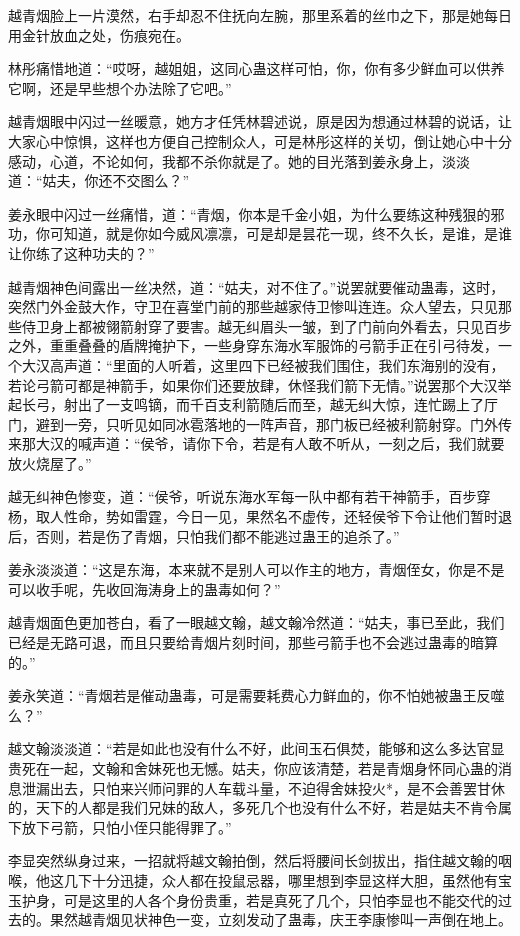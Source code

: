 越青烟脸上一片漠然，右手却忍不住抚向左腕，那里系着的丝巾之下，那是她每日用金针放血之处，伤痕宛在。

林彤痛惜地道：“哎呀，越姐姐，这同心蛊这样可怕，你，你有多少鲜血可以供养它啊，还是早些想个办法除了它吧。”

越青烟眼中闪过一丝暖意，她方才任凭林碧述说，原是因为想通过林碧的说话，让大家心中惊惧，这样也方便自己控制众人，可是林彤这样的关切，倒让她心中十分感动，心道，不论如何，我都不杀你就是了。她的目光落到姜永身上，淡淡道：“姑夫，你还不交图么？”

姜永眼中闪过一丝痛惜，道：“青烟，你本是千金小姐，为什么要练这种残狠的邪功，你可知道，就是你如今威风凛凛，可是却是昙花一现，终不久长，是谁，是谁让你练了这种功夫的？”

越青烟神色间露出一丝决然，道：“姑夫，对不住了。”说罢就要催动蛊毒，这时，突然门外金鼓大作，守卫在喜堂门前的那些越家侍卫惨叫连连。众人望去，只见那些侍卫身上都被翎箭射穿了要害。越无纠眉头一皱，到了门前向外看去，只见百步之外，重重叠叠的盾牌掩护下，一些身穿东海水军服饰的弓箭手正在引弓待发，一个大汉高声道：“里面的人听着，这里四下已经被我们围住，我们东海别的没有，若论弓箭可都是神箭手，如果你们还要放肆，休怪我们箭下无情。”说罢那个大汉举起长弓，射出了一支鸣镝，而千百支利箭随后而至，越无纠大惊，连忙踢上了厅门，避到一旁，只听见如同冰雹落地的一阵声音，那门板已经被利箭射穿。门外传来那大汉的喊声道：“侯爷，请你下令，若是有人敢不听从，一刻之后，我们就要放火烧屋了。”

越无纠神色惨变，道：“侯爷，听说东海水军每一队中都有若干神箭手，百步穿杨，取人性命，势如雷霆，今日一见，果然名不虚传，还轻侯爷下令让他们暂时退后，否则，若是伤了青烟，只怕我们都不能逃过蛊王的追杀了。”

姜永淡淡道：“这是东海，本来就不是别人可以作主的地方，青烟侄女，你是不是可以收手呢，先收回海涛身上的蛊毒如何？”

越青烟面色更加苍白，看了一眼越文翰，越文翰冷然道：“姑夫，事已至此，我们已经是无路可退，而且只要给青烟片刻时间，那些弓箭手也不会逃过蛊毒的暗算的。”

姜永笑道：“青烟若是催动蛊毒，可是需要耗费心力鲜血的，你不怕她被蛊王反噬么？”

越文翰淡淡道：“若是如此也没有什么不好，此间玉石俱焚，能够和这么多达官显贵死在一起，文翰和舍妹死也无憾。姑夫，你应该清楚，若是青烟身怀同心蛊的消息泄漏出去，只怕来兴师问罪的人车载斗量，不迫得舍妹投火*，是不会善罢甘休的，天下的人都是我们兄妹的敌人，多死几个也没有什么不好，若是姑夫不肯令属下放下弓箭，只怕小侄只能得罪了。”

李显突然纵身过来，一招就将越文翰拍倒，然后将腰间长剑拔出，指住越文翰的咽喉，他这几下十分迅捷，众人都在投鼠忌器，哪里想到李显这样大胆，虽然他有宝玉护身，可是这里的人各个身份贵重，若是真死了几个，只怕李显也不能交代的过去的。果然越青烟见状神色一变，立刻发动了蛊毒，庆王李康惨叫一声倒在地上。

